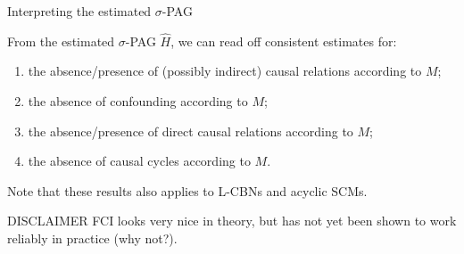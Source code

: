 \begin{frame}{Interpreting the estimated $\sigma$-PAG}
\begin{Cor}[continued]
From the estimated $\sigma$-PAG $\hat{H}$, we can read off consistent estimates for:
  \begin{enumerate}
  \item the absence/presence of (possibly indirect) causal relations according to $M$; 
  \item the absence of confounding according to $M$;
  \item the absence/presence of direct causal relations according to $M$;
  \item the absence of causal cycles according to $M$.
  \end{enumerate}
\end{Cor}
Note that these results also applies to L-CBNs and acyclic SCMs.

\bigskip
  \begin{block}{DISCLAIMER}
    FCI looks very nice in theory, but has not yet been shown to work reliably in practice (why not?).
  \end{block}
\end{frame}
